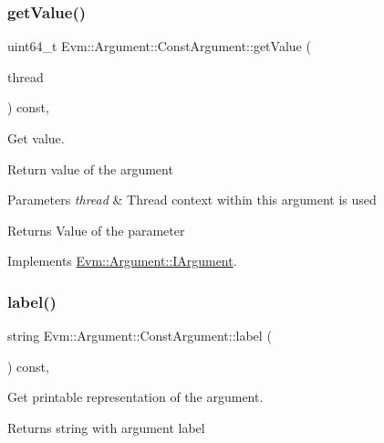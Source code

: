 \subsubsection{\texorpdfstring{get\+Value()}{getValue()}}
{\footnotesize\ttfamily uint64\+\_\+t Evm\+::\+Argument\+::\+Const\+Argument\+::get\+Value (\begin{DoxyParamCaption}\item[{\mbox{\hyperlink{struct_evm_1_1_thread_context}{Thread\+Context}} \&}]{thread }\end{DoxyParamCaption}) const\hspace{0.3cm}{\ttfamily [override]}, {\ttfamily [virtual]}}



Get value. 

Return value of the argument 
\begin{DoxyParams}{Parameters}
{\em thread} & Thread context within this argument is used \\
\hline
\end{DoxyParams}
\begin{DoxyReturn}{Returns}
Value of the parameter 
\end{DoxyReturn}


Implements \mbox{\hyperlink{struct_evm_1_1_argument_1_1_i_argument_af01db10f34498344831877847c2fc038}{Evm\+::\+Argument\+::\+I\+Argument}}.

\mbox{\label{struct_evm_1_1_argument_1_1_const_argument_a90801800ff37e785e946f077f1c486f6}} 
\subsubsection{\texorpdfstring{label()}{label()}}
{\footnotesize\ttfamily string Evm\+::\+Argument\+::\+Const\+Argument\+::label (\begin{DoxyParamCaption}{ }\end{DoxyParamCaption}) const\hspace{0.3cm}{\ttfamily [override]}, {\ttfamily [virtual]}}



Get printable representation of the argument. 

\begin{DoxyReturn}{Returns}
string with argument label 
\end{DoxyReturn}


